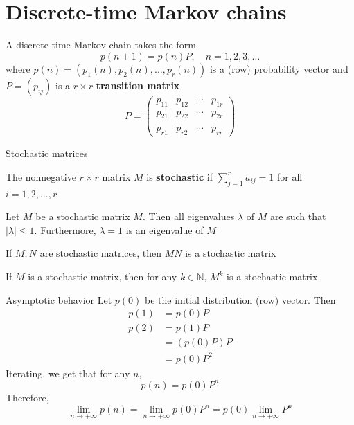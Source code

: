 \documentclass[aspectratio=169]{beamer}
\begin{document}
\section{Discrete-time Markov chains}

\begin{frame}
A discrete-time Markov chain takes the form
\[
p(n+1)=p(n)P, \quad n=1,2,3,\dots
\]
where $p(n)=(p_1(n),p_{2}(n),\dots , p_r(n))$ is a (row) probability vector and $P=(p_{ij})$ is a $r\times r$ \textbf{transition matrix}
\[
P=
\begin{pmatrix}
p_{11} & p_{12} & \cdots & p_{1r} \\
p_{21} & p_{22} & \cdots & p_{2r} \\
&&& \\
p_{r1} & p_{r2} & \cdots & p_{rr}
\end{pmatrix}
\]
\end{frame}

\begin{frame}{Stochastic matrices}
\begin{definition}
    The nonnegative $r\times r$ matrix $M$ is \textbf{stochastic} if $\sum_{j=1}^ra_{ij}=1$ for all $i=1,2,\dots, r$    
\end{definition}
\vfill
\begin{definition}
Let $M$ be a stochastic matrix $M$. Then all eigenvalues $\lambda$ of $M$ are such that $|\lambda|\leq 1$. Furthermore, $\lambda =1$ is an eigenvalue of $M$
\end{definition}
\vfill
\begin{theorem}
    If $M,N$ are stochastic matrices, then $MN$ is a stochastic matrix
\end{theorem}
\vfill
\begin{theorem}
    If $M$ is a stochastic matrix, then for any $k\in\mathbb{N}$, $M^k$ is a stochastic matrix
\end{theorem}
\end{frame}

\begin{frame}{Asymptotic behavior}
    Let $p(0)$ be the initial distribution (row) vector. Then
\begin{align*}
p(1) &= p(0)P \\
p(2) &= p(1)P\\
&= (p(0)P)P \\
&= p(0)P^2
\end{align*}
Iterating, we get that for any $n$,
$$
p(n)=p(0)P^n
$$
Therefore, 
$$
\lim_{n\rightarrow +\infty}p(n)=\lim_{n\rightarrow +\infty}p(0)P^n=p(0)\lim_{n\rightarrow +\infty}P^n
$$
\end{frame}
\end{document}
